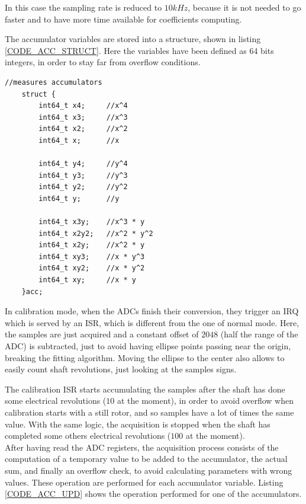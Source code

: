 \documentclass[main]{subfiles}
\begin{document}
In this case the sampling rate is reduced to $10kHz$, because it is not needed to
go faster and to have more time available for coefficients computing.

The accumulator variables are stored into a structure, shown in listing 
\ref{CODE_ACC_STRUCT}. Here the variables have been defined as 64 bits integers,
in order to stay far from overflow conditions.

\begin{minipage}[h]{\linewidth}
\begin{lstlisting}[caption=Samples accumulator structure, label=CODE_ACC_STRUCT]
    //measures accumulators
    struct {
        int64_t x4;     //x^4
        int64_t x3;     //x^3
        int64_t x2;     //x^2
        int64_t x;      //x

        int64_t y4;     //y^4
        int64_t y3;     //y^3
        int64_t y2;     //y^2
        int64_t y;      //y

        int64_t x3y;    //x^3 * y
        int64_t x2y2;   //x^2 * y^2
        int64_t x2y;    //x^2 * y
        int64_t xy3;    //x * y^3
        int64_t xy2;    //x * y^2
        int64_t xy;     //x * y
    }acc;
\end{lstlisting}
\end{minipage}

In calibration mode, when the ADCs finish their conversion, they trigger an \ac{IRQ}
which is served by an \ac{ISR}, which is different from the one of normal mode.
Here, the samples are just acquired and a constant offset of $2048$ (half the 
range of the ADC) is subtracted, just to avoid having ellipse points passing near 
the origin, breaking the fitting algorithm.
Moving the ellipse to the center also allows to easily count shaft revolutions,
just looking at the samples signs.

The calibration \ac{ISR} starts accumulating the samples after the shaft has done
some electrical revolutions ($10$ at the moment), in order to avoid overflow when 
calibration starts with a still rotor, and so samples have a lot of times the same
value.
With the same logic, the acquisition is stopped when the shaft has completed some 
others electrical revolutions ($100$ at the moment).\\

After having read the ADC registers, the acquisition process consists of the 
computation of a temporary value to be added to the accumulator, the actual sum, 
and finally an overflow check, to avoid calculating parameters with wrong values.
These operation are performed for each accumulator variable.
Listing \ref{CODE_ACC_UPD} shows the operation performed for one of the accumulators.
\end{document}
